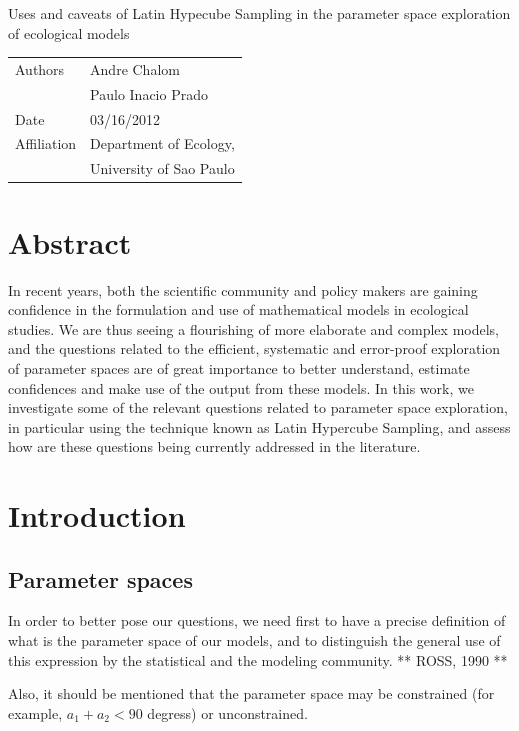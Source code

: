 \documentclass[12pt,a4paper]{article}
\begin{document}
\begin{center}
  {\Large Uses and caveats of Latin Hypecube Sampling in the parameter space exploration of ecological models}

\begin{table}[hbt]{\small
\begin{tabular}{ll}
Authors        & Andre Chalom \\
               & Paulo Inacio Prado \\
Date           & 03/16/2012 \\
Affiliation    & Department of Ecology, \\
	       & University of Sao Paulo 
\end{tabular} }
\end{table}
\end{center}

\mbox{}\vspace{-14mm}\mbox{}


\section*{Abstract}
In recent years, both the scientific community and policy makers are gaining confidence in the formulation 
and use of mathematical models in ecological studies. We are thus seeing a flourishing of more elaborate
and complex models, and the questions related to the efficient, systematic and error-proof exploration of 
parameter spaces are of great importance to better understand, estimate confidences and make use of the output
from these models. In this work, we investigate some of the relevant questions related to parameter space
exploration, in particular using the technique known as Latin Hypercube Sampling, and assess how are these
questions being currently addressed in the literature.

\section{Introduction}\label{Introduction}
\subsection{Parameter spaces}
In order to better pose our questions, we need first to have a precise definition of what is the parameter space
of our models, and to distinguish the general use of this expression by the statistical and the modeling community.
** ROSS, 1990 **

Also, it should be mentioned that the parameter space may be constrained (for example, $a_1 + a_2 < 90$ degress) or unconstrained.
\end{document}
